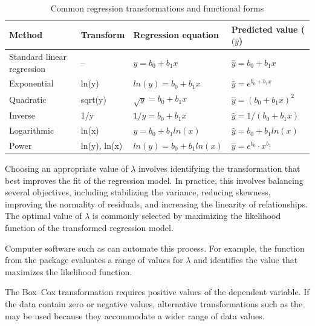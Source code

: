 \begin{table}
\begin{tabularx}{\textheight}{X Y Y Y}
\toprule
\parbox[t]{3 cm}{Method} &
Transform &
Regression equation &
Predicted value ($(\hat{y}$)  \\

\midrule

Standard linear regression & -- & $y = b_0 + b_1x$ & $\hat{y} = b_0 + b_1x$ \\
Exponential & ln(y) & $ln(y) = b_0 + b_1x$ & $\hat{y} = e^{b_0 + b_1x}$ \\
Quadratic & sqrt(y) & $\sqrt{y} = b_0 + b_1x$ & $\hat{y} = (b_0 + b_1x)^2$ \\
Inverse & 1/y & $1/y = b_0 + b_1x$ & $\hat{y} = 1 / (b_0 + b_1x)$ \\
Logarithmic & ln(x) & $y = b_0 + b_1ln(x)$ & $\hat{y} = b_0 + b_1ln(x)$ \\
Power & ln(y), ln(x) & $ln(y) = b_0 + b_1ln(x)$ & $\hat{y} = e^{b_0} \cdot x^{b_1}$ \\

\bottomrule
\end{tabularx}
\caption{Common regression transformations and functional forms}
\label{tab:list_of_common_transformation_methods}
\end{table}

\bigskip

Choosing an appropriate value of \(\lambda\) involves identifying the transformation that best improves the fit of the regression model. In practice, this involves balancing several objectives, including stabilizing the variance, reducing skewness, improving the normality of residuals, and increasing the linearity of relationships. The optimal value of \(\lambda\) is commonly selected by maximizing the likelihood function of the transformed regression model.

Computer software such as  can automate this process. For example, the  function from the  package evaluates a range of values for \(\lambda\) and identifies the value that maximizes the likelihood function.

\bigskip

The Box--Cox transformation requires positive values of the dependent variable. If the data contain zero or negative values, alternative transformations such as the  may be used because they accommodate a wider range of data values.

